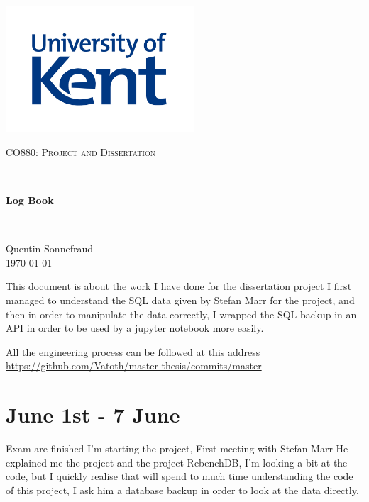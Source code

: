\documentclass[12pt,a4paper]{article}
\author{Quentin Sonnefraud}
\date{1 April 2019 - 30 August 2019}
\def\title{Log Book}
\newcommand{\HRule}{\rule{\linewidth}{0.5mm}}
\begin{document}
\thispagestyle{plain}
\begin{titlepage}
	\begin{sffamily}
		\begin{center}

			\begin{center}
				\includegraphics[width=7cm]{assets/kent_logo.png}
			\end{center}
			\vspace{2cm}
			{\scshape\Large CO880: Project and Dissertation }\\[2cm]
			\HRule \\[0.4cm]
			{ \huge \bfseries \title \\[0.4cm] }
			\HRule \\[2cm]
			\bigskip
			\centering\LARGE{Quentin Sonnefraud} \\ \bigskip
			\Large{\today}


			\vfill
		\end{center}
	\end{sffamily}
\end{titlepage}

\pagebreak

\pagestyle{fancy}

\tableofcontents

\pagebreak

This document is about the work I have done for the dissertation project I first managed to understand the SQL data given by Stefan Marr for the project, and then in order to manipulate the data correctly, I wrapped the SQL backup in an API in order to be used by a jupyter notebook more easily.

All the engineering process can be followed at this address \url{https://github.com/Vatoth/master-thesis/commits/master}

\section{June 1st  - 7 June}
Exam are finished I'm starting the project, First meeting with Stefan Marr He explained me the project and the project RebenchDB, I'm looking a bit at the code, but I quickly realise that will spend to much time understanding the code of this project, I ask him a database backup in order to look at the data directly.
\end{document}
